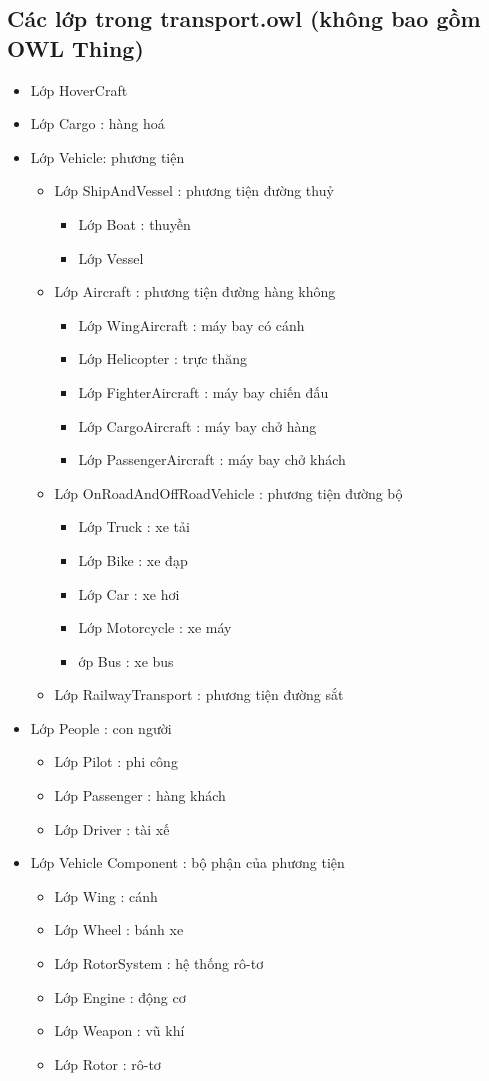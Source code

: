\subsection{Các lớp trong transport.owl (không bao gồm OWL Thing)}
\begin{itemize}
\item Lớp HoverCraft
\item Lớp Cargo : hàng hoá
\item Lớp Vehicle: phương tiện
		\begin{itemize}
		\item Lớp ShipAndVessel : phương tiện đường thuỷ
			\begin{itemize}
			\item Lớp Boat : thuyền
			\item Lớp Vessel
			\end{itemize}
		\item Lớp Aircraft : phương tiện đường hàng không
			\begin{itemize}
			\item Lớp WingAircraft : máy bay có cánh
			\item Lớp Helicopter : trực thăng 
			\item Lớp FighterAircraft : máy bay chiến đấu
			\item Lớp CargoAircraft : máy bay chở hàng
			\item Lớp PassengerAircraft : máy bay chở khách
			\end{itemize}
		\item Lớp OnRoadAndOffRoadVehicle : phương tiện đường bộ
			\begin{itemize}
				\item Lớp Truck : xe tải
				\item Lớp Bike : xe đạp
				\item Lớp Car : xe hơi
				\item Lớp Motorcycle : xe máy
				\item ớp Bus : xe bus
			\end{itemize}	
		\item Lớp RailwayTransport : phương tiện đường sắt
		\end{itemize}
\item Lớp People : con người
	\begin{itemize}
	\item Lớp Pilot : phi công
	\item Lớp Passenger : hàng khách
	\item Lớp Driver : tài xế
	\end{itemize}
\item Lớp Vehicle Component : bộ phận của phương tiện
	\begin{itemize}
	\item Lớp Wing : cánh
	\item Lớp Wheel : bánh xe
	\item Lớp RotorSystem : hệ thống rô-tơ
	\item Lớp Engine : động cơ
	\item Lớp Weapon : vũ khí
	\item Lớp Rotor : rô-tơ
	\end{itemize}
\end{itemize}
